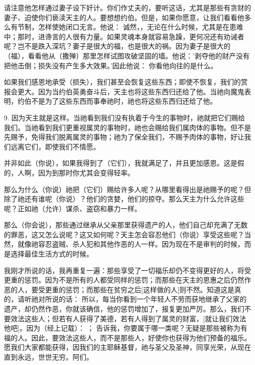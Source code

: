请注意他怎样通过妻子设下奸计。你们作丈夫的，要听这话，尤其是那些有贪财的妻子、迫使你们亵渎天主的人。要想想约伯。但是，如果你愿意，让我们看看他多么有节制，怎样使她闭口无言。他说： 诚然，，无论在什么时候，尤其是在患难中；那时，进谗言的人很有力量。如果灵魂本身就容易急躁，更何况还有劝诫者呢？岂不是跌入深坑？妻子是很大的福，也是很大的祸。因为妻子是很大的（福），看看他从（撒殚）那里怎样试图攻破坚固的墙。他说：'剥夺他的财产没有把他击倒；损失没有产生多大效果。'因此他说： 你看他向往的是什么。\par

如果我们感恩地承受（损失），我们甚至会恢复这些东西；即使不恢复，我们的赏报会更大。因为当约伯英勇奋斗后，天主也将这些东西归还给了他。当祂向魔鬼表明，约伯不是为了这些东西而事奉祂时，祂也将这些东西归还给了他。\par

9. 因为天主就是这样。当祂看到我们没有执着于今生的事物时，祂就把它们赐给我们。当祂看到我们更重视属灵的事物时，祂也会赐给我们属肉体的事物。但不是先赐予，免得我们脱离属灵的事物；祂为了保全我们，不赐予肉体的事物，好让我们远离它们，即使我们不情愿。\par

并非如此（你说），如果我得到了（它们），我就满足了，并且更加感恩。这是假的，人啊，因为到那时你尤其会变得轻率。\par

那么为什么（你说）祂把（它们）赐给许多人呢？从哪里看得出是祂赐予的呢？但除了祂还有谁呢（你说）？他们的贪婪，他们的掠夺。那么天主为什么允许这些呢？正如祂（允许）谋杀、盗窃和暴力一样。\par

那么（你会说），那些通过继承从父亲那里获得遗产的人，他们自己却充满了无数的罪恶，这又怎么说呢？这又如何呢？天主怎会容忍他们（你说）享受这些呢？当然，就像祂容忍盗贼、杀人犯和其他作恶的人一样。因为现在不是审判的时候，而是选择最佳生活方式的时候。\par

我刚才所说的话，我再重复一遍：那些享受了一切福乐却仍不变得更好的人，将受更重的惩罚。因为不是所有的人都受同样的惩罚；而那些在天主的恩惠之后仍然作恶的人，要受更重的惩罚；而那些在贫穷之后[这样做的人]则不然。知道这是真的，请听祂对所说的话：  所以，每当你看到一个年轻人不劳而获地继承了父家的遗产，却仍然作恶，你就该确信，他的惩罚增加了，报复更加严厉。那么，我们不要效法这些人；但若有人获得了美德，若有人得到了属灵的财富，[就让我们效法他吧]。因为（经上记载）： ；  告诉我，你要属于哪一类呢？无疑是那些被称为有福的人。因此，要效法这些人，而不是那些人，好使你也获得为他们预备的福乐。愿我们大家都能获得，因我们的主耶稣基督，祂与圣父及圣神，同享光荣，从现在直到永远，世世无穷。阿们。\par

